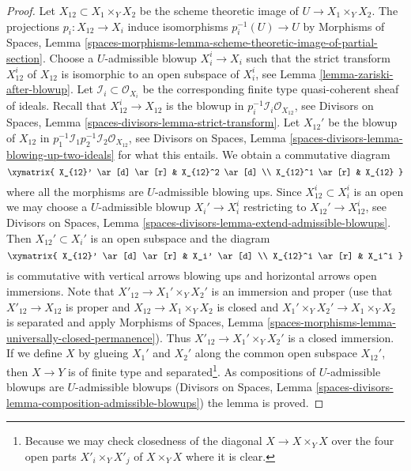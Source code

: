 \begin{proof}
\medskip\noindent
Let $X_{12} \subset X_1 \times_Y X_2$ be the scheme theoretic image
of $U \to X_1 \times_Y X_2$. The projections $p_i : X_{12} \to X_i$
induce isomorphisms $p_i^{-1}(U) \to U$ by
Morphisms of Spaces, Lemma
\ref{spaces-morphisms-lemma-scheme-theoretic-image-of-partial-section}.
Choose a $U$-admissible blowup $X_i^i \to X_i$ such that
the strict transform $X_{12}^i$ of $X_{12}$ is isomorphic to an
open subspace of $X_i^i$, see
Lemma \ref{lemma-zariski-after-blowup}.
Let $\mathcal{I}_i \subset \mathcal{O}_{X_i}$ be the corresponding
finite type quasi-coherent sheaf of ideals.
Recall that $X_{12}^i \to X_{12}$ is the blowup in
$p_i^{-1}\mathcal{I}_i \mathcal{O}_{X_{12}}$, see
Divisors on Spaces, Lemma \ref{spaces-divisors-lemma-strict-transform}.
Let $X_{12}'$ be the blowup of $X_{12}$ in
$p_1^{-1}\mathcal{I}_1 p_2^{-1}\mathcal{I}_2 \mathcal{O}_{X_{12}}$, see
Divisors on Spaces, Lemma \ref{spaces-divisors-lemma-blowing-up-two-ideals}
for what this entails. We obtain a commutative diagram
$$
\xymatrix{
X_{12}' \ar[d] \ar[r] & X_{12}^2 \ar[d] \\
X_{12}^1 \ar[r] & X_{12}
}
$$
where all the morphisms are $U$-admissible blowing ups. Since
$X_{12}^i \subset X_i^i$ is an open we may choose a $U$-admissible blowup
$X_i' \to X_i^i$ restricting to $X_{12}' \to X_{12}^i$, see
Divisors on Spaces, Lemma
\ref{spaces-divisors-lemma-extend-admissible-blowups}.
Then $X_{12}' \subset X_i'$ is an open subspace and the diagram
$$
\xymatrix{
X_{12}' \ar[d] \ar[r] & X_i' \ar[d] \\
X_{12}^i \ar[r] & X_i^i
}
$$
is commutative with vertical arrows blowing ups and horizontal arrows
open immersions. Note that $X'_{12} \to X_1' \times_Y X_2'$ is
an immersion and proper (use that $X'_{12} \to X_{12}$ is proper
and $X_{12} \to X_1 \times_Y X_2$ is closed and $X_1' \times_Y X_2' \to
X_1 \times_Y X_2$ is separated and apply Morphisms of Spaces, Lemma
\ref{spaces-morphisms-lemma-universally-closed-permanence}).
Thus $X'_{12} \to  X_1' \times_Y X_2'$ is a closed immersion.
If we define $X$ by glueing $X_1'$ and $X_2'$ along the common open
subspace $X_{12}'$, then $X \to Y$ is of finite type and
separated\footnote{Because we may check closedness of the diagonal
$X \to X \times_Y X$ over the four open parts $X'_i \times_Y X'_j$
of $X \times_Y X$ where it is clear.}. As compositions of
$U$-admissible blowups are $U$-admissible blowups
(Divisors on Spaces, Lemma
\ref{spaces-divisors-lemma-composition-admissible-blowups})
the lemma is proved.
\end{proof}

